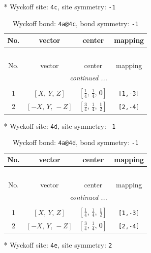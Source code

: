 \documentclass[fleqn,8pt]{jsarticle}
\begin{document}
* Wyckoff site: {\tt 4c}, site symmetry: {\tt -1}
\renewcommand{\arraystretch}{1.2}
\begin{longtable}{cccc}
\caption{Wyckoff bond: {\tt 4a@4c}, bond symmetry: {\tt -1}}
 \\
 \hline \hline
No. & vector & center & mapping \\ \hline \endfirsthead

\multicolumn{3}{l}{\tablename\ \thetable{}} \\
 \hline \hline
No. & vector & center & mapping \\ \hline \endhead

 \hline \hline
\multicolumn{3}{r}{\footnotesize\it continued ...} \\ \endfoot

 \hline \hline
\multicolumn{3}{r}{} \\ \endlastfoot

1 & $\left[ X,\, Y,\, Z \right]$ & $\left[ \frac{1}{4},\, \frac{1}{4},\, 0 \right]$ & {\tt [1,-3]} \\ \hline
2 & $\left[ - X,\, Y,\, - Z \right]$ & $\left[ \frac{3}{4},\, \frac{1}{4},\, \frac{1}{2} \right]$ & {\tt [2,-4]} \\
\end{longtable}
* Wyckoff site: {\tt 4d}, site symmetry: {\tt -1}
\renewcommand{\arraystretch}{1.2}
\begin{longtable}{cccc}
\caption{Wyckoff bond: {\tt 4a@4d}, bond symmetry: {\tt -1}}
 \\
 \hline \hline
No. & vector & center & mapping \\ \hline \endfirsthead

\multicolumn{3}{l}{\tablename\ \thetable{}} \\
 \hline \hline
No. & vector & center & mapping \\ \hline \endhead

 \hline \hline
\multicolumn{3}{r}{\footnotesize\it continued ...} \\ \endfoot

 \hline \hline
\multicolumn{3}{r}{} \\ \endlastfoot

1 & $\left[ X,\, Y,\, Z \right]$ & $\left[ \frac{1}{4},\, \frac{1}{4},\, \frac{1}{2} \right]$ & {\tt [1,-3]} \\ \hline
2 & $\left[ - X,\, Y,\, - Z \right]$ & $\left[ \frac{3}{4},\, \frac{1}{4},\, 0 \right]$ & {\tt [2,-4]} \\
\end{longtable}
* Wyckoff site: {\tt 4e}, site symmetry: {\tt 2}
\end{document}
